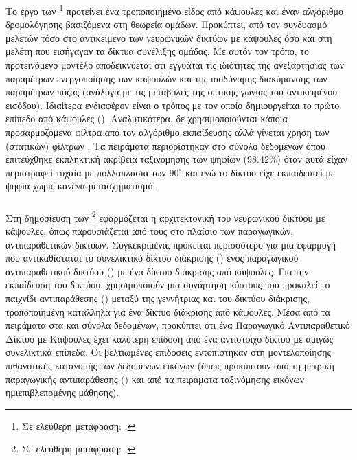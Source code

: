 \subsubsection{}

Το έργο των  \footnote{Σε ελεύθερη μετάφραση: .} \cite{lenssen2018group} προτείνει ένα τροποποιημένο είδος από κάψουλες και έναν αλγόριθμο δρομολόγησης βασιζόμενα στη θεωρεία ομάδων. Προκύπτει, από τον συνδυασμό μελετών τόσο στο αντικείμενο των νευρωνικών δικτύων με κάψουλες όσο και στη μελέτη που εισήγαγαν τα δίκτυα συνέλιξης ομάδας\cite{cohen2016group}. Με αυτόν τον τρόπο, το προτεινόμενο μοντέλο αποδεικνύεται ότι εγγυάται τις ιδιότητες της ανεξαρτησίας των παραμέτρων ενεργοποίησης των καψουλών και της ισοδύναμης διακύμανσης των παραμέτρων πόζας (ανάλογα με τις μεταβολές της οπτικής γωνίας του αντικειμένου εισόδου). Ιδιαίτερα ενδιαφέρον είναι ο τρόπος με τον οποίο δημιουργείται το πρώτο επίπεδο από κάψουλες (). Αναλυτικότερα, δε χρησιμοποιούνται κάποια προσαρμοζόμενα φίλτρα από τον αλγόριθμο εκπαίδευσης αλλά γίνεται χρήση των (στατικών) φίλτρων . Τα πειράματα περιορίστηκαν στο σύνολο δεδομένων  όπου επιτεύχθηκε εκπληκτική ακρίβεια ταξινόμησης των ψηφίων (98.42\%) όταν αυτά είχαν περιστραφεί τυχαία με πολλαπλάσια των $90^{\circ}$ και ενώ το δίκτυο είχε εκπαιδευτεί με ψηφία χωρίς κανένα μετασχηματισμό.


\subsubsection{}

Στη δημοσίευση των  \footnote{Σε ελεύθερη μετάφραση: .}\cite{jaiswal2018capsulegan} εφαρμόζεται η αρχιτεκτονική του νευρωνικού δικτύου με κάψουλες, όπως παρουσιάζεται από τους \cite{sabour2017dynamic} στο πλαίσιο των παραγωγικών, αντιπαραθετικών δικτύων. Συγκεκριμένα, πρόκειται περισσότερο για μια εφαρμογή που αντικαθίσταται το συνελικτικό δίκτυο διάκρισης () ενός παραγωγικού αντιπαραθετικού δικτύου () με ένα δίκτυο διάκρισης από κάψουλες. Για την εκπαίδευση του δικτύου, χρησιμοποιούν μια συνάρτηση κόστους που προκαλεί το παιχνίδι αντιπαράθεσης () μεταξύ της γεννήτριας και του δικτύου διάκρισης, τροποποιημένη κατάλληλα για ένα δίκτυο διάκρισης από κάψουλες. Μέσα από τα πειράματα στα  και  σύνολα δεδομένων, προκύπτει ότι ένα Παραγωγικό Αντιπαραθετικό Δίκτυο με Κάψουλες έχει καλύτερη επίδοση από ένα αντίστοιχο δίκτυο με αμιγώς συνελικτικά επίπεδα. Οι βελτιωμένες επιδόσεις εντοπίστηκαν στη μοντελοποίησης πιθανοτικής κατανομής των δεδομένων εικόνων (όπως προκύπτουν από τη μετρική παραγωγικής αντιπαράθεσης ()\cite{im2016generative} και από τα πειράματα ταξινόμησης εικόνων ημι\textendash επιβλεπομένης μάθησης).

